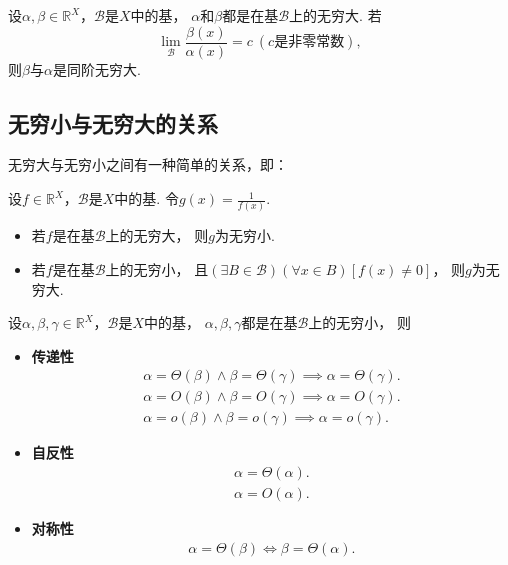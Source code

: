 \begin{proposition}
设\(\alpha,\beta\in\mathbb{R}^X\)，\(\mathcal{B}\)是\(X\)中的基，
\(\alpha\)和\(\beta\)都是在基\(\mathcal{B}\)上的无穷大.
若\[
	\lim_\mathcal{B} \frac{\beta(x)}{\alpha(x)} = c\ (\text{$c$是非零常数}),
\]
则\(\beta\)与\(\alpha\)是同阶无穷大.
\end{proposition}

\subsection{无穷小与无穷大的关系}
无穷大与无穷小之间有一种简单的关系，即：
\begin{theorem}\label{theorem:极限.无穷大与无穷小的关系}
设\(f\in\mathbb{R}^X\)，\(\mathcal{B}\)是\(X\)中的基.
令\(g(x) = \frac1{f(x)}\).
\begin{itemize}
	\item 若\(f\)是在基\(\mathcal{B}\)上的无穷大，
	则\(g\)为无穷小.

	\item 若\(f\)是在基\(\mathcal{B}\)上的无穷小，
	且\((\exists B\in\mathcal{B})(\forall x\in B)[f(x) \neq 0]\)，
	则\(g\)为无穷大.
\end{itemize}
\end{theorem}

\begin{proposition}%
设\(\alpha,\beta,\gamma\in\mathbb{R}^X\)，\(\mathcal{B}\)是\(X\)中的基，
\(\alpha,\beta,\gamma\)都是在基\(\mathcal{B}\)上的无穷小，
则\begin{itemize}
	\item {\rm\bf 传递性}\begin{gather*}
		\alpha = \Theta(\beta)
		\land
		\beta = \Theta(\gamma)
		\implies
		\alpha = \Theta(\gamma). \\
		\alpha = O(\beta)
		\land
		\beta = O(\gamma)
		\implies
		\alpha = O(\gamma). \\
		\alpha = o(\beta)
		\land
		\beta = o(\gamma)
		\implies
		\alpha = o(\gamma).
	\end{gather*}

	\item {\rm\bf 自反性}\begin{gather*}
		\alpha = \Theta(\alpha). \\
		\alpha = O(\alpha).
	\end{gather*}

	\item {\rm\bf 对称性}\begin{gather*}
		\alpha = \Theta(\beta)
		\iff
		\beta = \Theta(\alpha).
	\end{gather*}
\end{itemize}
\end{proposition}

